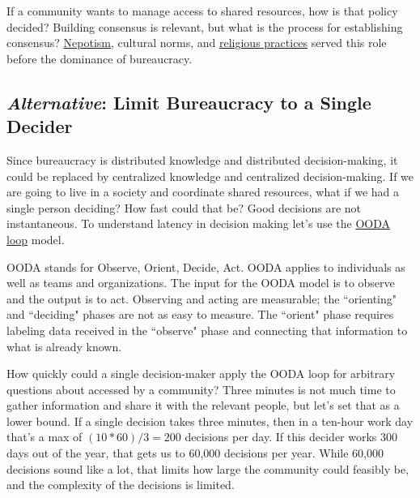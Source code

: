 If a community wants to manage access to shared resources, how is that policy decided?  Building consensus is relevant, but what is the process for establishing consensus? 
\href{https://en.wikipedia.org/wiki/Nepotism}{Nepotism},
\iftoggle{WPinmargin}{\marginpar{$>$Wikipedia: Nepotism}}{}
cultural norms, and 
\href{https://en.wikipedia.org/wiki/Religion}{religious practices}
served this role before the dominance of bureaucracy. 


\subsection*{\textit{Alternative}: Limit Bureaucracy to a Single Decider\label{sec:single-decider}}

Since bureaucracy is distributed knowledge and distributed decision-making, it could be replaced by centralized knowledge and centralized decision-making. If we are going to live in a society and coordinate shared resources, what if we had a single person deciding? How fast could that be? Good decisions are not instantaneous. To understand latency in decision making let's use the
\href{https://en.wikipedia.org/wiki/OODA_loop}{OODA loop} 
\iftoggle{WPinmargin}{\marginpar{$>$Wikipedia: OODA loop}}{}
model. 

OODA stands for Observe, Orient, Decide, Act. OODA applies to individuals as well as teams and organizations. 
The input for the OODA model is to observe and the output is to act. Observing and acting are measurable; the ``orienting" and ``deciding" phases are not as easy to measure. The ``orient" phase requires labeling data received in the ``observe" phase and connecting that information to what is already known.

How quickly could a single decision-maker apply the OODA loop for arbitrary questions about \iftoggle{glossarysubstitutionworks}{\glspl{shared resource}}{shared resources} accessed by a community? Three minutes is not much time to gather information and share it with the relevant people, but let's set that as a lower bound.
If a single decision takes three minutes, then in a ten-hour work day that's a max of $(10*60)/3 = 200$ decisions per day. If this decider works 300 days out of the year, that gets us to 60,000 decisions per year. While 60,000 decisions sound like a lot, that limits how large the community could feasibly be, and the complexity of the decisions is limited. 


